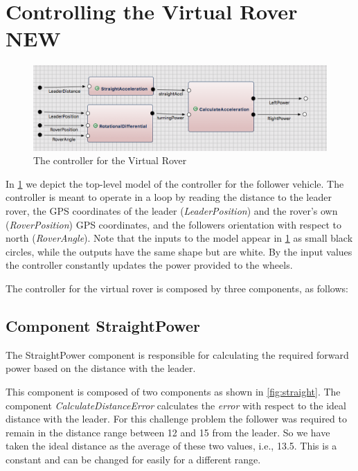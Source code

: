 \section{Controlling the Virtual Rover NEW}
\label{sec:control_vr_model}

\begin{figure}[!h]
	\centering
	\includegraphics[width=1\textwidth]{images/acc.png}
	\caption{The controller for the Virtual Rover}
	\label{fig:acc}
\end{figure}

In \fig\ref{fig:acc} we depict the top-level model of the controller for the
follower vehicle. The controller is meant to operate in a loop by reading the
 {distance} to
the leader rover, the GPS coordinates of the leader (\textit{LeaderPosition}) and the rover's own (\textit{RoverPosition}) GPS
coordinates, and the followers orientation with respect to north (\textit{RoverAngle}).
Note that the inputs to the model appear in \fig\ref{fig:acc}  as small
black circles, while the outputs have the same shape but are white. By the
input values the controller constantly updates the power provided to the
wheels.

The controller for the virtual rover is composed by three \af components,
as follows:
\subsection{Component StraightPower}
The \textsf{StraightPower} component is responsible for calculating the required forward power based on the distance with the leader.

This component is composed of two components as shown in \fig\ref{fig:straight}. The component \textit{CalculateDistanceError} calculates the \textit{error} with respect to the ideal distance with the leader. For this challenge problem the follower was required to remain in the distance range between 12 and 15 from the leader. So we have taken the ideal distance as the average of these two values, i.e., 13.5. This is a constant and can be changed for easily for a different range.

